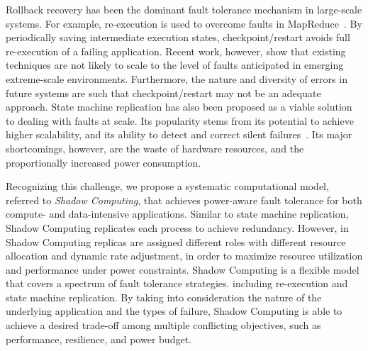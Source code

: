 Rollback recovery has been the dominant fault tolerance mechanism in large-scale systems. For example, re-execution
is used to overcome faults in MapReduce~\cite{Dean2004}. By periodically saving intermediate execution states, checkpoint/restart avoids full re-execution of a failing application. Recent work, however, show that existing techniques are  not likely to scale to the level of faults anticipated in emerging extreme-scale environments. Furthermore, the nature and diversity of errors in future systems are such that checkpoint/restart may not be an adequate approach. 
State machine replication has also been proposed as a
viable solution to dealing with faults at scale. Its popularity
stems from its potential to achieve higher scalability, and
its ability to detect and correct silent failures~\cite{fiala2012detection,ferreira2011evaluating}. Its major shortcomings, however, are the waste of hardware resources, and the proportionally increased power consumption.


Recognizing this challenge, we propose a systematic computational model, referred to \textit{Shadow Computing}, that achieves power-aware fault tolerance for both compute- and data-intensive applications. Similar to state machine replication, Shadow Computing replicates each process to achieve redundancy. However, in Shadow Computing replicas are assigned different roles with different resource allocation and dynamic rate adjustment, in order to maximize resource utilization and performance under power constraints.  
Shadow Computing is a flexible model that covers a spectrum of fault tolerance strategies. including re-execution and state machine replication. By taking into consideration the nature of the underlying application and the types of failure, Shadow Computing is able to achieve a desired trade-off among multiple conflicting objectives, such as performance, resilience, and power budget.  

